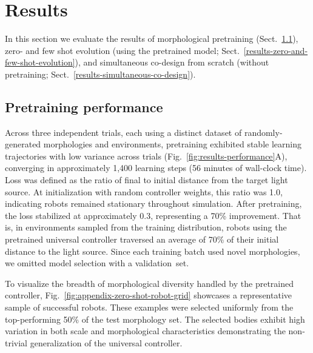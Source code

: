 \section{Results}
\label{sec:results}

In this section we evaluate 
the results of 
morphological pretraining (Sect.~\ref{results-pretraining-performance}),
zero- and few shot evolution (using the pretrained model; Sect.~\ref{results-zero-and-few-shot-evolution}),
and simultaneous co-design from scratch (without pretraining; Sect.~\ref{results-simultaneous-co-design}).


\subsection{Pretraining performance}
\label{results-pretraining-performance}

Across three independent trials,
each using a distinct dataset of 
randomly-generated morphologies and environments,
pretraining 
exhibited stable learning trajectories 
with low variance across trials (Fig.~\ref{fig:results-performance}A), 
converging in approximately 1,400 learning steps (56 minutes of wall-clock time).
% 
Loss was defined as the ratio of final to initial distance from the target light source. 
At initialization with random controller weights, this ratio was 1.0, indicating robots remained stationary throughout simulation. 
After pretraining, the loss stabilized at approximately 0.3, representing a 70\% improvement. 
That is, in environments sampled from the training distribution, robots using the pretrained universal controller traversed an average of 70\% of their initial distance to the light source. 
Since each training batch used novel morphologies, we omitted model selection with a \mbox{validation set.}


To visualize the breadth of morphological diversity handled by the pretrained controller, Fig.~\ref{fig:appendix-zero-shot-robot-grid} showcases a representative sample of successful robots. 
These examples were selected uniformly from the top-performing 50\% of the test morphology set. 
The selected bodies exhibit high variation in both scale and morphological characteristics demonstrating the non-trivial generalization of the universal controller.


